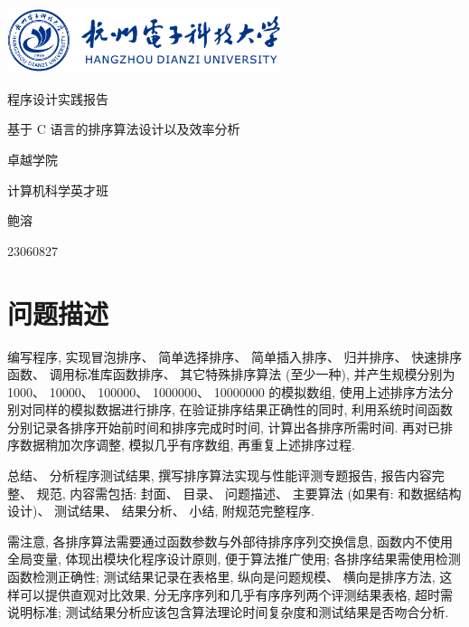 \documentclass[12pt]{article}
\begin{document}
\begin{titlepage}


\parbox[c]{8cm}{
    \includegraphics[width=8cm]{assets/hdu.png}
}

\setlength{\parindent}{0pt}
\centering
\vfill
{ \heiti \textcolor{xblue}{程序设计实践报告}\par}
\vspace{10pt}
{ \heiti 基于 C 语言的排序算法设计以及效率分析\par}
\vfill
{\large \heiti 卓越学院\par
计算机科学英才班\par
鲍溶\par
23060827\par
}
\vfill
\restoregeometry

\end{titlepage}

\renewcommand\contentsname{\textcolor{xblue}{目录}}
    \tableofcontents
\clearpage
\setcounter{page}{1}

\section{问题描述}

编写程序, 实现冒泡排序、 简单选择排序、 简单插入排序、 归并排序、 快速排序函数、 调用标准库函数排序、 其它特殊排序算法 (至少一种), 并产生规模分别为 1000、 10000、 100000、 1000000、 10000000 的模拟数组, 使用上述排序方法分别对同样的模拟数据进行排序, 在验证排序结果正确性的同时, 利用系统时间函数分别记录各排序开始前时间和排序完成时时间, 计算出各排序所需时间. 再对已排序数据稍加次序调整, 模拟几乎有序数组, 再重复上述排序过程.

总结、 分析程序测试结果, 撰写排序算法实现与性能评测专题报告, 报告内容完整、 规范, 内容需包括: 封面、 目录、 问题描述、 主要算法 (如果有: 和数据结构设计)、 测试结果、 结果分析、 小结, 附规范完整程序.

需注意, 各排序算法需要通过函数参数与外部待排序序列交换信息, 函数内不使用全局变量, 体现出模块化程序设计原则, 便于算法推广使用; 各排序结果需使用检测函数检测正确性; 测试结果记录在表格里, 纵向是问题规模、 横向是排序方法, 这样可以提供直观对比效果, 分无序序列和几乎有序序列两个评测结果表格, 超时需说明标准; 测试结果分析应该包含算法理论时间复杂度和测试结果是否吻合分析.
\end{document}
